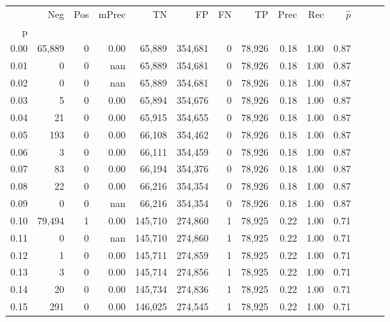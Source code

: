 \begin{tabular}{rrrrrrrrrrrrrr}
\toprule
{} &     Neg &     Pos & mPrec &       TN &       FP &      FN &      TP &  Prec &   Rec & $\hat{p}$ \\
p    &         &         &       &          &          &         &         &       &       &           \\
\midrule
0.00 &  65,889 &       0 &  0.00 &   65,889 &  354,681 &       0 &  78,926 &  0.18 &  1.00 &      0.87 \\
0.01 &       0 &       0 &   nan &   65,889 &  354,681 &       0 &  78,926 &  0.18 &  1.00 &      0.87 \\
0.02 &       0 &       0 &   nan &   65,889 &  354,681 &       0 &  78,926 &  0.18 &  1.00 &      0.87 \\
0.03 &       5 &       0 &  0.00 &   65,894 &  354,676 &       0 &  78,926 &  0.18 &  1.00 &      0.87 \\
0.04 &      21 &       0 &  0.00 &   65,915 &  354,655 &       0 &  78,926 &  0.18 &  1.00 &      0.87 \\
0.05 &     193 &       0 &  0.00 &   66,108 &  354,462 &       0 &  78,926 &  0.18 &  1.00 &      0.87 \\
0.06 &       3 &       0 &  0.00 &   66,111 &  354,459 &       0 &  78,926 &  0.18 &  1.00 &      0.87 \\
0.07 &      83 &       0 &  0.00 &   66,194 &  354,376 &       0 &  78,926 &  0.18 &  1.00 &      0.87 \\
0.08 &      22 &       0 &  0.00 &   66,216 &  354,354 &       0 &  78,926 &  0.18 &  1.00 &      0.87 \\
0.09 &       0 &       0 &   nan &   66,216 &  354,354 &       0 &  78,926 &  0.18 &  1.00 &      0.87 \\
0.10 &  79,494 &       1 &  0.00 &  145,710 &  274,860 &       1 &  78,925 &  0.22 &  1.00 &      0.71 \\
0.11 &       0 &       0 &   nan &  145,710 &  274,860 &       1 &  78,925 &  0.22 &  1.00 &      0.71 \\
0.12 &       1 &       0 &  0.00 &  145,711 &  274,859 &       1 &  78,925 &  0.22 &  1.00 &      0.71 \\
0.13 &       3 &       0 &  0.00 &  145,714 &  274,856 &       1 &  78,925 &  0.22 &  1.00 &      0.71 \\
0.14 &      20 &       0 &  0.00 &  145,734 &  274,836 &       1 &  78,925 &  0.22 &  1.00 &      0.71 \\
0.15 &     291 &       0 &  0.00 &  146,025 &  274,545 &       1 &  78,925 &  0.22 &  1.00 &      0.71 \\

\end{tabular}
